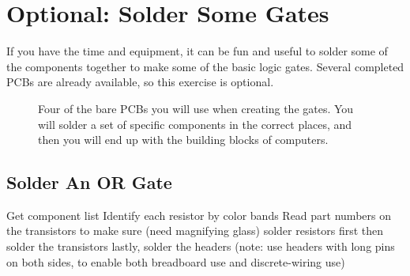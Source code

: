 \section{Optional: Solder Some Gates}

If you have the time and equipment, it can be fun and useful to solder some of the components together to make some of the basic logic gates. Several completed PCBs are already available, so this exercise is optional. %

\begin{figure}[h!]
\begin{center}
\end{center}
\caption{Four of the bare PCBs you will use when creating the gates. You will solder a set of specific components in the correct places, and then you will end up with the building blocks of computers.}
\label{fig:barepcbs}
\end{figure}

\subsection*{Solder An OR Gate}

\bi

\+ Get component list 
\+ Identify each resistor by color bands
\+ Read part numbers on the transistors to make sure (need magnifying glass)
\+ solder resistors first
\+ then solder the transistors 
\+ lastly, solder the headers (note: use headers with long pins on both sides, to enable both breadboard use and discrete-wiring use)

\ei

